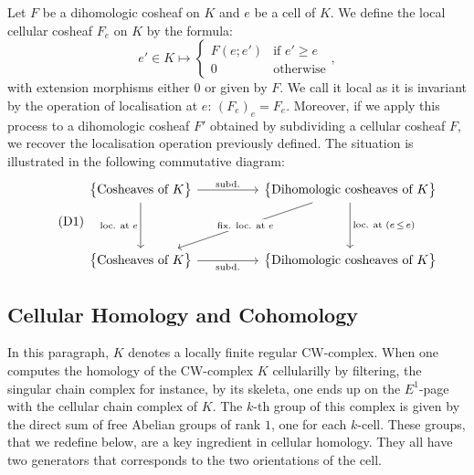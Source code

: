 \documentclass[AHL,Unicode,longabstracts,published]{cedram}
\begin{document}
\begin{defi}
Let $F$ be a dihomologic cosheaf on $K$ and $e$ be a cell of $K$. We define the local cellular cosheaf $F_e$ on $K$ by the formula:
\begin{equation*}
e'\in K \longmapsto \left\{
\begin{array}{cl} F(e;e') & \text{if }e'\geq e \\ 0 & \text{otherwise}
\end{array}\right.,
\end{equation*}
with extension morphisms either $0$ or given by $F$. We call it local as it is invariant by the operation of localisation at $e$: $(F_e)_e=F_e$. Moreover, if we apply this process to a dihomologic cosheaf $F'$ obtained by subdividing a cellular cosheaf $F$, we recover the localisation operation previously defined. The situation is illustrated in the following commutative diagram:
\begin{equation}
\tag{D1}\label{diag:comm_rel_loc}
\begin{tikzcd}
\big\{\textnormal{Cosheaves of }K\big\} \arrow[dd,"\textnormal{loc. at }e" left] \arrow[rr,"\textnormal{subd.}"] & & \big\{\textnormal{Dihomologic cosheaves of }K\big\} \arrow[ddll,"\textnormal{fix. loc. at }e" description] \arrow[dd,"\textnormal{loc. at }(e\,\leq\,e)"] \\%
& \\%
\big\{\textnormal{Cosheaves of }K\big\} \ar[rr,"\textnormal{subd.}" below] & & \big\{\textnormal{Dihomologic cosheaves of }K\big\}
\end{tikzcd}
\end{equation}
\end{defi}

\subsection{Cellular Homology and Cohomology}

In this paragraph, $K$ denotes a locally finite regular CW-complex. When one computes the homology of the CW-complex $K$ cellularilly by filtering, the singular chain complex for instance, by its skeleta, one ends up on the $E^1$-page with the cellular chain complex of $K$. The $k$-th group of this complex is given by the direct sum of free Abelian groups of rank $1$, one for each $k$-cell. These groups, that we redefine below, are a key ingredient in cellular homology. They all have two generators that corresponds to the two orientations of the cell.
\end{document}
